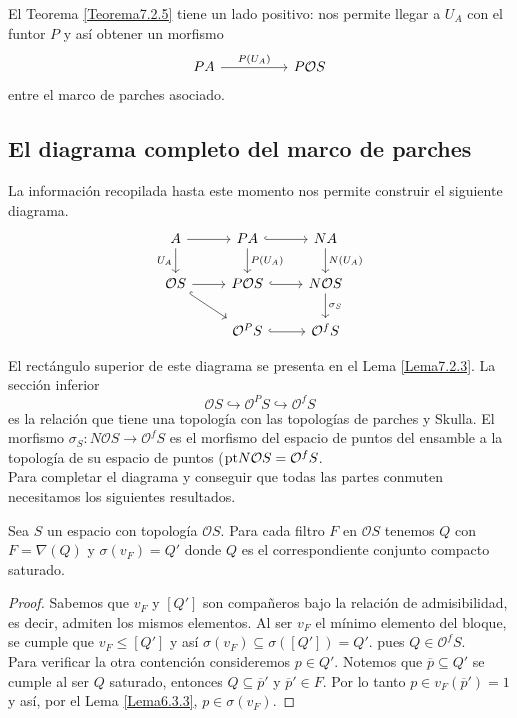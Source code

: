 El Teorema \ref{Teorema7.2.5} tiene un lado positivo: nos permite llegar a $U_A$ con el funtor $P$ y así obtener un morfismo 
\[\begin{tikzcd}
	PA && {P\mathcal{O}S}
	\arrow["{P(U_A)}", from=1-1, to=1-3]
\end{tikzcd}\]
entre el marco de parches asociado.

\subsection{El diagrama completo del marco de parches}

La información recopilada hasta este momento nos permite construir el siguiente diagrama.
\[\begin{tikzcd}
	A & PA & NA \\
	{\mathcal{O}S} & {P\mathcal{O}S} & {N\mathcal{O}S} \\
	& {\mathcal{O}^PS} & {\mathcal{O}^fS}
	\arrow[from=1-1, to=1-2]
	\arrow["{U_A}"', from=1-1, to=2-1]
	\arrow[hook, from=1-2, to=1-3]
	\arrow["{P(U_A)}", from=1-2, to=2-2]
	\arrow["{N(U_A)}", from=1-3, to=2-3]
	\arrow[from=2-1, to=2-2]
	\arrow[hook, from=2-1, to=3-2]
	\arrow[hook, from=2-2, to=2-3]
	\arrow["{\sigma_S}", from=2-3, to=3-3]
	\arrow[hook, from=3-2, to=3-3]
\end{tikzcd}\]

El rectángulo superior de este diagrama se presenta en el Lema \ref{Lema7.2.3}. La sección inferior
\[
\mathcal{O}S\hookrightarrow \mathcal{O}^PS\hookrightarrow \mathcal{O}^fS
\]
es la relación que tiene una topología con las topologías de parches y Skulla. El morfismo $\sigma_S\colon N\mathcal{O}S\to \mathcal{O}^fS$ es el morfismo del espacio de puntos del ensamble a la topología de su espacio de puntos ($\mathrm{pt} N\mathcal{O}S=\mathcal{O}^fS$.\\

Para completar el diagrama y conseguir que todas las partes conmuten necesitamos los siguientes resultados.
\begin{lem}\label{Lema7.3.1}
    Sea $S$ un espacio con topología $\mathcal{O}S$. Para cada filtro $F$ en $\mathcal{O}S$ tenemos $Q$ con $F=\nabla(Q)$ y $\sigma(v_F)=Q'$ donde $Q$ es el correspondiente conjunto compacto saturado.
\end{lem}

\begin{proof}
    Sabemos que $v_F$ y $[Q']$ son compañeros bajo la relación de admisibilidad, es decir, admiten los mismos elementos. Al ser $v_F$ el mínimo elemento del bloque, se cumple que $v_F\leq [Q']$ y así $\sigma(v_F)\subseteq \sigma([Q'])=Q'$. pues $Q\in \mathcal{O}^fS$.\\

    Para verificar la otra contención consideremos $p\in Q'$. Notemos que $\overline{p}\subseteq Q'$ se cumple al ser $Q$ saturado, entonces $Q\subseteq \overline{p}'$ y $\overline{p}'\in F$. Por lo tanto $p\in v_F(\overline{p}')=1$ y así, por el Lema \ref{Lema6.3.3}, $p\in \sigma(v_F)$.
\end{proof}

